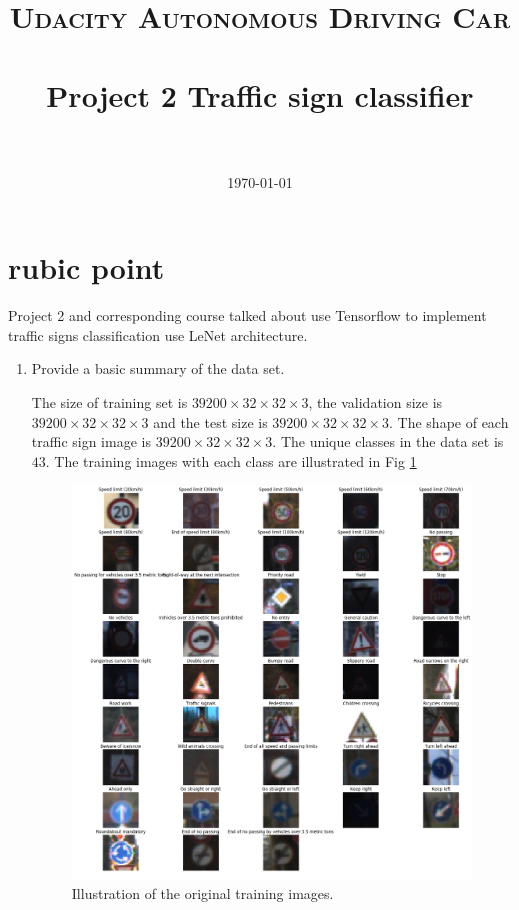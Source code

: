 \documentclass[paper=a4, fontsize=11pt]{scrartcl}
\title{
		\usefont{OT1}{bch}{b}{n}
		\normalfont \normalsize \textsc{Udacity Autonomous Driving Car} \\ [25pt]
		\horrule{0.5pt} \\[0.4cm]
		\huge Project 2 Traffic sign classifier \\
		\horrule{2pt} \\[0.5cm]
}
\author{
		\normalfont 								\normalsize
        \today
}
\date{}
\numberwithin{equation}{section}		%
\numberwithin{figure}{section}			%
\numberwithin{table}{section}				%
\begin{document}
\maketitle
\section{rubic point}
Project 2 and corresponding course talked about use Tensorflow to implement traffic signs classification use LeNet architecture. 

\begin{enumerate}
\item Provide a basic summary of the data set.

The size of training set is $39200 \times 32 \times 32 \times 3$, the validation size is  $39200 \times 32 \times 32 \times 3$ and the test size is $39200 \times 32 \times 32 \times 3$. The shape of each traffic sign image is $39200 \times 32 \times 32 \times 3$. The unique classes in the data set is $43$. The training images with each class are illustrated in Fig \ref{fig:originalimage}
\begin{figure}
  \centering
  \includegraphics[width=1.0\linewidth]{trainimg.png}
  \caption{Illustration of the original training images.}
  \label{fig:originalimage}
\end{figure} 


\end{enumerate}
\end{document}

